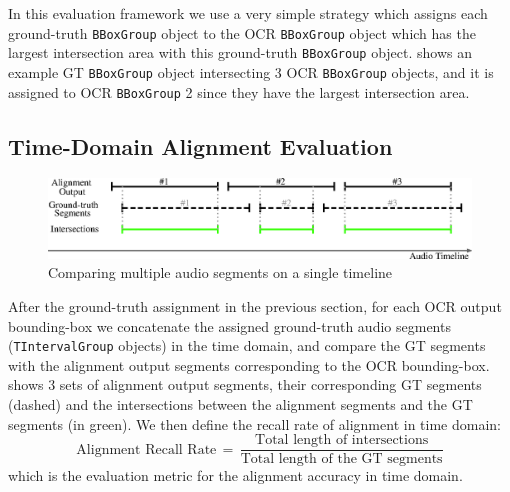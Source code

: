 In this evaluation framework we use a very simple strategy which assigns each ground-truth \texttt{BBoxGroup} object to the OCR \texttt{BBoxGroup} object which has the largest intersection area with this ground-truth \texttt{BBoxGroup} object.  shows an example GT \texttt{BBoxGroup} object intersecting 3 OCR \texttt{BBoxGroup} objects, and it is assigned to OCR \texttt{BBoxGroup} 2 since they have the largest intersection area.

\subsection{Time-Domain Alignment Evaluation}

\begin{figure}[!tb]
    \centering
    \includegraphics[width=.9\textwidth]{eval-time-domain.eps}
    \caption{Comparing multiple audio segments on a single timeline}
    \label{fig:eval-time-domain}
\end{figure}

After the ground-truth assignment in the previous section, for each OCR output bounding-box we concatenate the assigned ground-truth audio segments (\texttt{TIntervalGroup} objects) in the time domain, and compare the GT segments with the alignment output segments corresponding to the OCR bounding-box.  shows 3 sets of alignment output segments, their corresponding GT segments (dashed) and the intersections between the alignment segments and the GT segments (in green). We then define the recall rate of alignment in time domain:
\begin{equation}
    \text{Alignment Recall Rate}\,=\,\frac{\text{Total length of intersections}}{\text{Total length of the GT segments}}
\end{equation}
which is the evaluation metric for the alignment accuracy in time domain.


